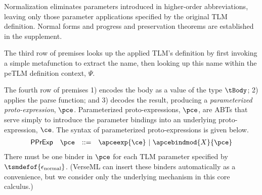 \documentclass[acmsmall,10pt,review,anonymous]{acmart}\settopmatter{printfolios=true}
\begin{document}
Normalization eliminates parameters introduced in higher-order abbreviations, leaving only those parameter applications specified by the original TLM definition. Normal forms and progress and preservation theorems are established in the supplement.

The third row of premises looks up the applied TLM's definition by first invoking a simple metafunction to extract the name, then looking up this name within the peTLM definition context, $\Psi$.


The fourth row of premises 1) encodes the body as a value of the type $\tBody$; 2) applies the parse function; and 3) decodes the result, producing a \emph{parameterized proto-expression}, $\pce$. Parameterized proto-expressions, $\pce$, are ABTs that serve simply to introduce the parameter bindings into an underlying proto-expression, $\ce$. The syntax of parameterized proto-expressions is given below.
\[\begin{array}{llcl}
\mathsf{PPrExp} & \pce & ::= & \apceexp{\ce} ~\vert~ \apcebindmod{X}{\pce}
\end{array}\]
There must be one binder in $\pce$ for each TLM parameter specified by $\tsmdefof{\epsilon_\text{normal}}$. (VerseML can insert these binders automatically as a convenience, but we consider only the underlying mechanism in this core calculus.) 
\end{document}
